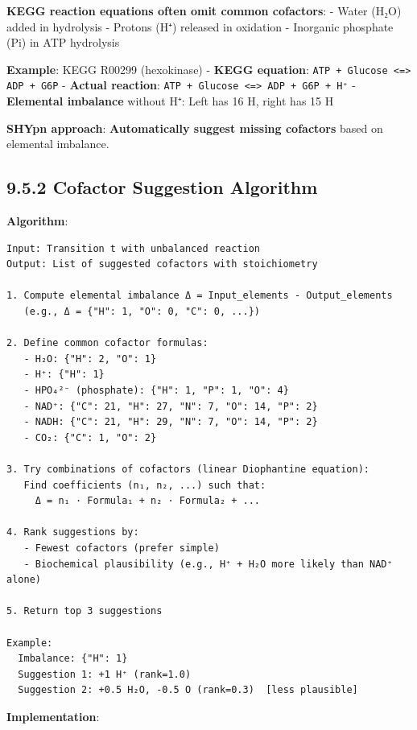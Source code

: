\textbf{KEGG reaction equations often omit common cofactors}: - Water
(H₂O) added in hydrolysis - Protons (H⁺) released in oxidation -
Inorganic phosphate (Pi) in ATP hydrolysis

\textbf{Example}: KEGG R00299 (hexokinase) - \textbf{KEGG equation}:
\passthrough{\lstinline!ATP + Glucose <=> ADP + G6P!} - \textbf{Actual
reaction}: \passthrough{\lstinline!ATP + Glucose <=> ADP + G6P + H⁺!} -
\textbf{Elemental imbalance} without H⁺: Left has 16 H, right has 15 H

\textbf{SHYpn approach}: \textbf{Automatically suggest missing
cofactors} based on elemental imbalance.

\hypertarget{cofactor-suggestion-algorithm}{%
\subsection{9.5.2 Cofactor Suggestion
Algorithm}\label{cofactor-suggestion-algorithm}}

\textbf{Algorithm}:

\begin{lstlisting}
Input: Transition t with unbalanced reaction
Output: List of suggested cofactors with stoichiometry

1. Compute elemental imbalance Δ = Input_elements - Output_elements
   (e.g., Δ = {"H": 1, "O": 0, "C": 0, ...})

2. Define common cofactor formulas:
   - H₂O: {"H": 2, "O": 1}
   - H⁺: {"H": 1}
   - HPO₄²⁻ (phosphate): {"H": 1, "P": 1, "O": 4}
   - NAD⁺: {"C": 21, "H": 27, "N": 7, "O": 14, "P": 2}
   - NADH: {"C": 21, "H": 29, "N": 7, "O": 14, "P": 2}
   - CO₂: {"C": 1, "O": 2}

3. Try combinations of cofactors (linear Diophantine equation):
   Find coefficients (n₁, n₂, ...) such that:
     Δ = n₁ · Formula₁ + n₂ · Formula₂ + ...
   
4. Rank suggestions by:
   - Fewest cofactors (prefer simple)
   - Biochemical plausibility (e.g., H⁺ + H₂O more likely than NAD⁺ alone)

5. Return top 3 suggestions

Example:
  Imbalance: {"H": 1}
  Suggestion 1: +1 H⁺ (rank=1.0)
  Suggestion 2: +0.5 H₂O, -0.5 O (rank=0.3)  [less plausible]
\end{lstlisting}

\textbf{Implementation}:

